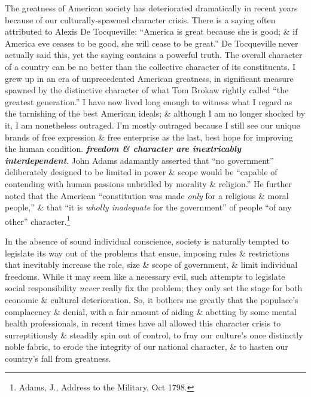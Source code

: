 \documentclass{article}
\numberwithin{equation}{section}
\begin{document}
The greatness of American society has deteriorated dramatically in recent years because of our culturally-spawned character crisis. There is a saying often attributed to Alexis De Tocqueville: ``America is great because she is good; \& if America eve ceases to be good, she will cease to be great.'' De Tocqueville never actually said this, yet the saying contains a powerful truth. The overall character of a country can be no better than the collective character of its constituents. I grew up in an era of unprecedented American greatness, in significant measure spawned by the distinctive character of what Tom Brokaw rightly called ``the greatest generation.'' I have now lived long enough to witness what I regard as the tarnishing of the best American ideals; \& although I am no longer shocked by it, I am nonetheless outraged. I'm mostly outraged because I still see our unique brands of free expression \& free enterprise as the last, best hope for improving the human condition. \textbf{\textit{freedom \& character are inextricably interdependent}}. John Adams adamantly asserted that ``no government'' deliberately designed to be limited in power \& scope would be ``capable of contending with human passions unbridled by morality \& religion.'' He further noted that the American ``constitution was made \textit{only} for a religious \& moral people,'' \& that ``it is \textit{wholly inadequate} for the government'' of people ``of any other'' character.\footnote{Adams, J., Address to the Military, Oct 1798.}

In the absence of sound individual conscience, society is naturally tempted to legislate its way out of the problems that ensue, imposing rules \& restrictions that inevitably increase the role, size \& scope of government, \& limit individual freedoms. While it may seem like a necessary evil, such attempts to legislate social responsibility \textit{never} really fix the problem; they only set the stage for both economic \& cultural deterioration. So, it bothers me greatly that the populace's complacency \& denial, with a fair amount of aiding \& abetting by some mental health professionals, in recent times have all allowed this character crisis to surreptitiously \& steadily spin out of control, to fray our culture's once distinctly noble fabric, to erode the integrity of our national character, \& to hasten our country's fall from greatness.
\end{document}
